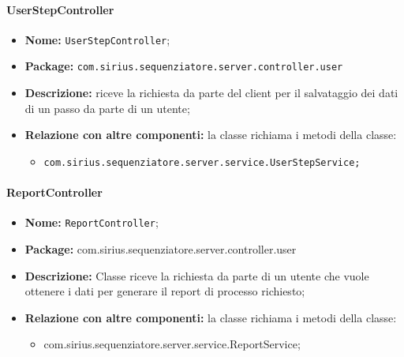 \paragraph{UserStepController}
	\begin{itemize}
		\item \textbf{Nome:} \texttt{UserStepController};
		\item \textbf{Package:} \texttt{com.sirius.sequenziatore.server.controller.user}
		\item \textbf{Descrizione:} riceve la richiesta da parte del client per il salvataggio dei dati di un passo da parte di un utente;
		\item \textbf{Relazione con altre componenti:} la classe richiama i metodi della classe:
		\begin{itemize}
			\item \texttt{com.sirius.sequenziatore.server.service.UserStepService;}
		\end{itemize}
	\end{itemize}
\paragraph{ReportController}
	\begin{itemize}
		\item \textbf{Nome:} \texttt{ReportController};
		\item \textbf{Package:} com.sirius.sequenziatore.server.controller.user
		\item \textbf{Descrizione:} Classe riceve la richiesta da parte di un utente che vuole ottenere i dati per generare il report di processo richiesto;
		\item \textbf{Relazione con altre componenti:} la classe richiama i metodi della classe:
		\begin{itemize}
			\item com.sirius.sequenziatore.server.service.ReportService;
		\end{itemize}
	\end{itemize}
